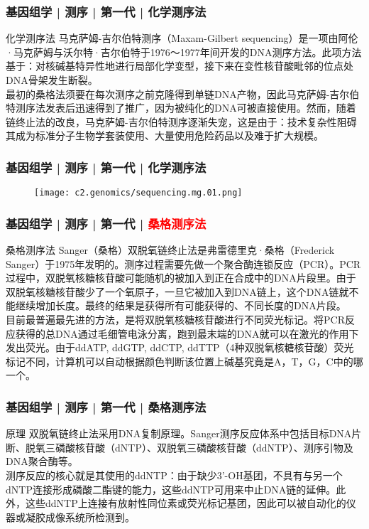 \begin{frame}
  \frametitle{基因组学 | 测序 | 第一代 | 化学测序法}
  \begin{block}{化学测序法}
马克萨姆-吉尔伯特测序（Maxam-Gilbert sequencing）是一项由阿伦·马克萨姆与沃尔特·吉尔伯特于1976～1977年间开发的DNA测序方法。此项方法基于：对核碱基特异性地进行局部化学变型，接下来在变性核苷酸毗邻的位点处DNA骨架发生断裂。\\
\vspace{1em}
最初的桑格法须要在每次测序之前克隆得到单链DNA产物，因此马克萨姆-吉尔伯特测序法发表后迅速得到了推广，因为被纯化的DNA可被直接使用。然而，随着链终止法的改良，马克萨姆-吉尔伯特测序逐渐失宠，这是由于：技术复杂性阻碍其成为标准分子生物学套装使用、大量使用危险药品以及难于扩大规模。
  \end{block}
\end{frame}

\begin{frame}
  \frametitle{基因组学 | 测序 | 第一代 | 化学测序法}
  \begin{figure}
    \centering
    \texttt{[image: c2.genomics/sequencing.mg.01.png]}
  \end{figure}
\end{frame}

\begin{frame}
  \frametitle{基因组学 | 测序 | 第一代 | \textcolor{red}{桑格测序法}}
  \begin{block}{桑格测序法}
Sanger（桑格）双脱氧链终止法是弗雷德里克·桑格（Frederick Sanger）于1975年发明的。测序过程需要先做一个聚合酶连锁反应（PCR）。PCR过程中，双脱氧核糖核苷酸可能随机的被加入到正在合成中的DNA片段里。由于双脱氧核糖核苷酸少了一个氧原子，一旦它被加入到DNA链上，这个DNA链就不能继续增加长度。最终的结果是获得所有可能获得的、不同长度的DNA片段。\\
\vspace{1em}
目前最普遍最先进的方法，是将双脱氧核糖核苷酸进行不同荧光标记。将PCR反应获得的总DNA通过毛细管电泳分离，跑到最末端的DNA就可以在激光的作用下发出荧光。由于ddATP, ddGTP, ddCTP, ddTTP（4种双脱氧核糖核苷酸）荧光标记不同，计算机可以自动根据颜色判断该位置上碱基究竟是A，T，G，C中的哪一个。 
  \end{block}
\end{frame}

\begin{frame}
  \frametitle{基因组学 | 测序 | 第一代 | 桑格测序法}
  \begin{block}{原理}
双脱氧链终止法采用DNA复制原理。Sanger测序反应体系中包括目标DNA片断、脱氧三磷酸核苷酸（dNTP）、双脱氧三磷酸核苷酸（ddNTP）、测序引物及DNA聚合酶等。\\
\vspace{1em}
测序反应的核心就是其使用的ddNTP：由于缺少3'-OH基团，不具有与另一个dNTP连接形成磷酸二酯键的能力，这些ddNTP可用来中止DNA链的延伸。此外，这些ddNTP上连接有放射性同位素或荧光标记基团，因此可以被自动化的仪器或凝胶成像系统所检测到。
  \end{block}
\end{frame}

